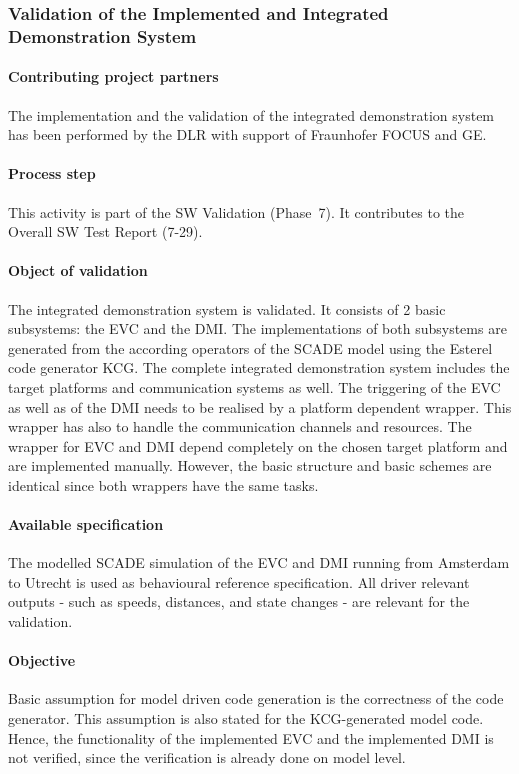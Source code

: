 

\subsubsection{Validation of the Implemented and Integrated Demonstration System}
\label{sec:VnV-Validation-DLR}


\paragraph{Contributing project partners}
The implementation and the validation of the integrated demonstration
system has been performed by the DLR with support of Fraunhofer FOCUS and
GE.


\paragraph{Process step}
This activity is part of the SW Validation (Phase~7). It contributes
to the Overall SW Test Report (7-29).


\paragraph{Object of validation}
The integrated demonstration system is validated. It consists of 2
basic subsystems: the EVC and the DMI. The implementations of both
subsystems are generated from the according operators of the SCADE
model using the Esterel code generator KCG. The complete integrated
demonstration system includes the target platforms and communication
systems as well. The triggering of the EVC as well as of the DMI needs
to be realised by a platform dependent wrapper. This wrapper has also
to handle the communication channels and resources. The wrapper for
EVC and DMI depend completely on the chosen target platform and are
implemented manually. However, the basic structure and basic schemes
are identical since both wrappers have the same tasks.


\paragraph{Available specification}
The modelled SCADE simulation of the EVC and DMI running from
Amsterdam to Utrecht is used as behavioural reference
specification. All driver relevant outputs - such as speeds,
distances, and state changes - are relevant for the validation.


\paragraph{Objective}
Basic assumption for model driven code generation is the correctness
of the code generator. This assumption is also stated for the
KCG-generated model code. Hence, the functionality of the implemented
EVC and the implemented DMI is not verified, since the verification is
already done on model level.

